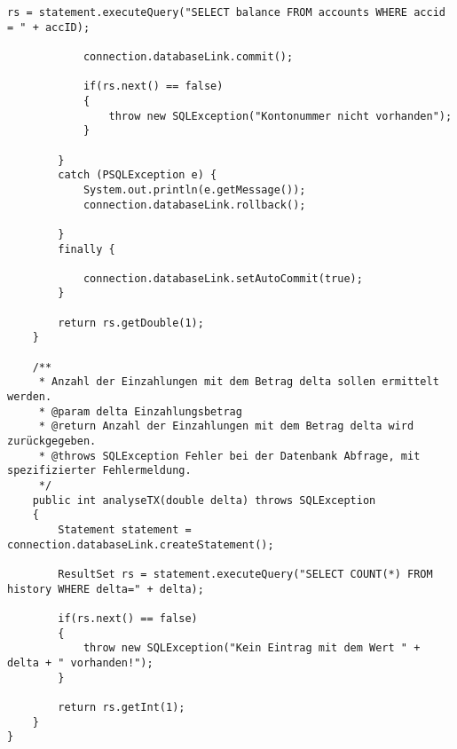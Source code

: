 \begin{lstlisting}[caption={TXHandler}, label={lst:pr4}]
			rs = statement.executeQuery("SELECT balance FROM accounts WHERE accid = " + accID);
			
			connection.databaseLink.commit();
			
			if(rs.next() == false)
			{
				throw new SQLException("Kontonummer nicht vorhanden");
			}
			
		}
		catch (PSQLException e) {
			System.out.println(e.getMessage());
			connection.databaseLink.rollback();
			
		}
		finally {

			connection.databaseLink.setAutoCommit(true);
		}
		
		return rs.getDouble(1);
	}
	
	/**
	 * Anzahl der Einzahlungen mit dem Betrag delta sollen ermittelt werden.
	 * @param delta Einzahlungsbetrag
	 * @return Anzahl der Einzahlungen mit dem Betrag delta wird zurückgegeben.
	 * @throws SQLException Fehler bei der Datenbank Abfrage, mit spezifizierter Fehlermeldung.
	 */
	public int analyseTX(double delta) throws SQLException
	{
		Statement statement = connection.databaseLink.createStatement();
		
		ResultSet rs = statement.executeQuery("SELECT COUNT(*) FROM history WHERE delta=" + delta);
		
		if(rs.next() == false)
		{
			throw new SQLException("Kein Eintrag mit dem Wert " + delta + " vorhanden!");
		}
		
		return rs.getInt(1);
	}
}
\end{lstlisting}


